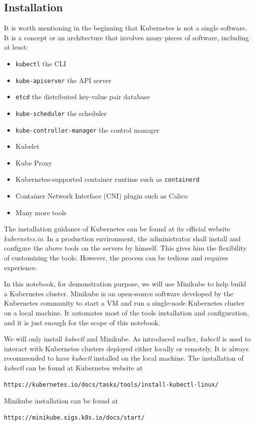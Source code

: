 \subsection{Installation}

It is worth mentioning in the beginning that Kubernetes is not a single software. It is a concept or an architecture that involves many pieces of software, including at least:
\begin{itemize}
  \item \verb|kubectl| the CLI
  \item \verb|kube-apiserver| the API server
  \item \verb|etcd| the distributed key-value pair database
  \item \verb|kube-scheduler| the scheduler
  \item \verb|kube-controller-manager| the control manager
  \item Kubelet
  \item Kube Proxy
  \item Kubernetes-supported container runtime such as \verb|containerd|
  \item Container Network Interface (CNI) plugin such as Calico
  \item Many more tools
\end{itemize}
The installation guidance of Kubernetes can be found at its official website \textit{kubernetes.io}. In a production environment, the administrator shall install and configure the above tools on the servers by himself. This gives him the flexibility of customizing the tools. However, the process can be tedious and requires experience.

In this notebook, for demonstration purpose, we will use Minikube to help build a Kubernetes cluster. Minikube is an open-source software developed by the Kubernetes community to start a VM and run a single-node Kubernetes cluster on a local machine. It automates most of the tools installation and configuration, and it is just enough for the scope of this notebook. 

We will only install \textit{kubectl} and Minikube. As introduced earlier, \textit{kubectl} is used to interact with Kubernetes clusters deployed either locally or remotely. It is always recommended to have \textit{kubectl} installed on the local machine. The installation of \textit{kubectl} can be found at Kubernetes website at
\begin{lstlisting}
https://kubernetes.io/docs/tasks/tools/install-kubectl-linux/
\end{lstlisting}
Minikube installation can be found at
\begin{lstlisting}
https://minikube.sigs.k8s.io/docs/start/
\end{lstlisting}


